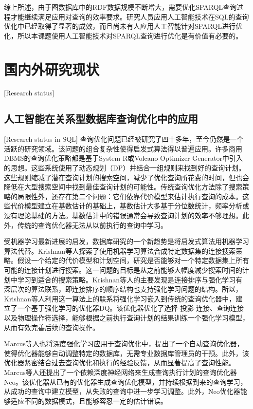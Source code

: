 综上所述，由于图数据库中的RDF数据规模不断增大，需要优化SPARQL查询过程才能继续满足应用对查询的效率要求。研究人员应用人工智能技术在SQL的查询优化中已经取得了显著的成效，而且尚未有人应用人工智能针对SPARQL进行优化，所以本课题使用人工智能技术对SPARQL查询进行优化是有价值有必要的。


\section{国内外研究现状}[Research status]

\subsection{人工智能在关系型数据库查询优化中的应用}[Research status in SQL]
查询优化问题已经被研究了四十多年，至今仍然是一个活跃的研究领域。该问题的组合复杂性使得启发式算法得以普遍应用\cite{DRL}。许多商用DBMS的查询优化策略都是基于System R\cite{SystemR}或Volcano Optimizer Generator\cite{Volcano}中引入的思想。这些系统使用了动态规划（DP）并结合一组规则来找到好的查询计划。这些规则缩减了潜在查询计划的搜索空间，减少了优化查询所花费的时间，但也会降低在大型搜索空间中找到最佳查询计划的可能性。传统查询优化方法除了搜索策略的局限性外，还存在第二个问题：它们依靠代价模型来估计执行查询的成本。这些代价模型建立在基数估计的基础上，基数估计大多基于分位数统计，频率分析或没有理论基础的方法。基数估计中的错误通常会导致查询计划的效率不够理想。此外，传统的查询优化器无法从以前执行的查询中学习。

受机器学习最新进展的启发，数据库研究的一个新趋势是将启发式算法用机器学习算法代替。Krishnan等人探索了使用机器学习算法合成特定数据集的连接搜索策略\cite{DRLJoin}。假设一个给定的代价模型和计划空间，研究是否能够对一个特定数据集上所有可能的连接计划进行搜索。这一问题的目标是从之前能够大幅度减少搜索时间的计划中学习到适合的搜索策略。Krishnan等人的主要发现是连接排序与强化学习有深层次的算法联系，即连接排序的顺序结构也支持强化学习问题的结构。所以，Krishnan等人利用这一算法上的联系将强化学习嵌入到传统的查询优化器中，建立了一个基于强化学习的优化器DQ。该优化器优化了选择-投影-连接、查询连接以及物理操作符选择，能够根据之前执行查询计划的结果训练一个强化学习模型，从而有效完善后续的查询操作。

Marcus等人也将深度强化学习应用于查询优化中，提出了一个自动查询优化器，使得优化器能够自动调整特定的数据库，无需专业数据库管理员的干预\cite{Hands-Free}。此外，该优化器紧密结合过去查询优化和执行的经验反馈，从而显著提高了查询性能。Marcus等人还提出了一个依赖深度神经网络来生成查询执行计划的查询优化器Neo\cite{Neo}。该优化器从已有的优化器生成查询优化模型，并持续根据到来的查询学习，从成功的查询中建立模型，从失败的查询中进一步学习调整。此外，Neo优化器能够适应不同的数据模式，且能够容忍一定的估计错误。

